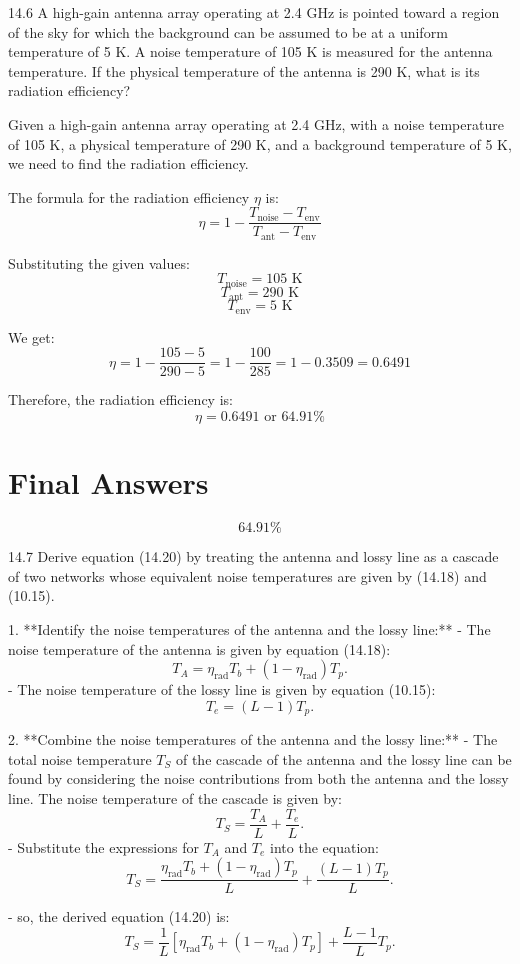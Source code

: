 \documentclass[cn,12pt]{homework}
\begin{document}
14.6 A high-gain antenna array operating at 2.4 GHz is pointed toward a region of the sky for which the
background can be assumed to be at a uniform temperature of 5 K. A noise temperature of 105 K is
measured for the antenna temperature. If the physical temperature of the antenna is 290 K, what is
its radiation efficiency?

\begin{solution}
Given a high-gain antenna array operating at 2.4 GHz, with a noise temperature of 105 K, a physical temperature of 290 K, and a background temperature of 5 K, we need to find the radiation efficiency.

The formula for the radiation efficiency \( \eta \) is:
\[ \eta = 1 - \frac{T_{\text{noise}} - T_{\text{env}}}{T_{\text{ant}} - T_{\text{env}}} \]

Substituting the given values:
\[ T_{\text{noise}} = 105 \text{ K} \]
\[ T_{\text{ant}} = 290 \text{ K} \]
\[ T_{\text{env}} = 5 \text{ K} \]

We get:
\[ \eta = 1 - \frac{105 - 5}{290 - 5} = 1 - \frac{100}{285} = 1 - 0.3509 = 0.6491 \]

Therefore, the radiation efficiency is:
\[ \eta = 0.6491 \text{ or } 64.91\% \]

\section*{Final Answers}
\[
\boxed{64.91\%}
\]

\end{solution}
\newpage


14.7 Derive equation (14.20) by treating the antenna and lossy line as a cascade of two networks whose
equivalent noise temperatures are given by (14.18) and (10.15).



\begin{solution}
  1. **Identify the noise temperatures of the antenna and the lossy line:**
   - The noise temperature of the antenna is given by equation (14.18):
     \[
     T_A = \eta_{\text{rad}} T_b + (1 - \eta_{\text{rad}})T_p.
     \]
   - The noise temperature of the lossy line is given by equation (10.15):
     \[
     T_e = (L - 1)T_p.
     \]

2. **Combine the noise temperatures of the antenna and the lossy line:**
   - The total noise temperature \( T_S \) of the cascade of the antenna and the lossy line can be found by considering the noise contributions from both the antenna and the lossy line. The noise temperature of the cascade is given by:
     \[
     T_S = \frac{T_A}{L} + \frac{T_e}{L}.
     \]
   - Substitute the expressions for \( T_A \) and \( T_e \) into the equation:
     \[
     T_S = \frac{\eta_{\text{rad}} T_b + (1 - \eta_{\text{rad}})T_p}{L} + \frac{(L - 1)T_p}{L}.
     \]

   - so, the derived equation (14.20) is:
     \[
     T_S = \frac{1}{L}[\eta_{\text{rad}} T_b + (1 - \eta_{\text{rad}})T_p] + \frac{L-1}{L}T_p.
     \]


\end{solution}
\newpage
\end{document}
